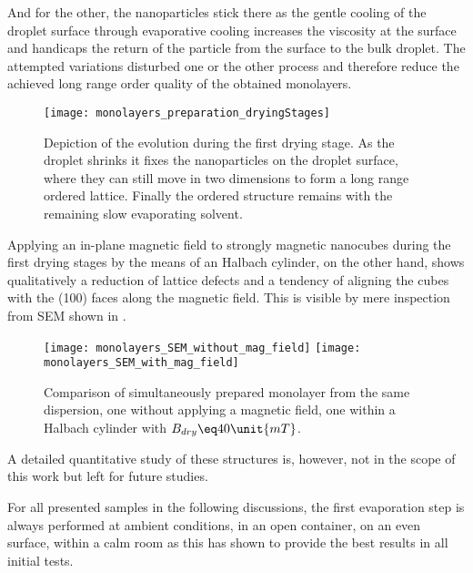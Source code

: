 \documentclass[\main/dresen_thesis.tex]{subfiles}
\begin{document}
    And for the other, the nanoparticles stick there as the gentle cooling of the droplet surface through evaporative cooling increases the viscosity at the surface and handicaps the return of the particle from the surface to the bulk droplet.
    The attempted variations disturbed one or the other process and therefore reduce the achieved long range order quality of the obtained monolayers.
    \begin{figure}[tb]
      \centering
      \texttt{[image: monolayers\_preparation\_dryingStages]}
      \caption{\label{fig:monolayers:preparation:dryingConditions:dryingStages} Depiction of the evolution during the first drying stage. As the droplet shrinks it fixes the nanoparticles on the droplet surface, where they can still move in two dimensions to form a long range ordered lattice. Finally the ordered structure remains with the remaining slow evaporating solvent.}
    \end{figure}

    Applying an in-plane magnetic field to strongly magnetic nanocubes during the first drying stages by the means of an Halbach cylinder, on the other hand, shows qualitatively a reduction of lattice defects and a tendency of aligning the cubes with the (100) faces along the magnetic field.
    This is visible by mere inspection from SEM shown in .
    \begin{figure}[tb]
      \centering
      \texttt{[image: monolayers\_SEM\_without\_mag\_field]}
      \texttt{[image: monolayers\_SEM\_with\_mag\_field]}
      \caption{\label{fig:monolayers:preparation:dryingConditions:magneticField}Comparison of simultaneously prepared monolayer from the same dispersion, one without applying a magnetic field, one within a Halbach cylinder with $B_{dry} \eq 40 \unit{mT}$.}
    \end{figure}
    A detailed quantitative study of these structures is, however, not in the scope of this work but left for future studies.

    For all presented samples in the following discussions, the first evaporation step is always performed at ambient conditions, in an open container, on an even surface, within a calm room as this has shown to provide the best results in all initial tests.
\end{document}
